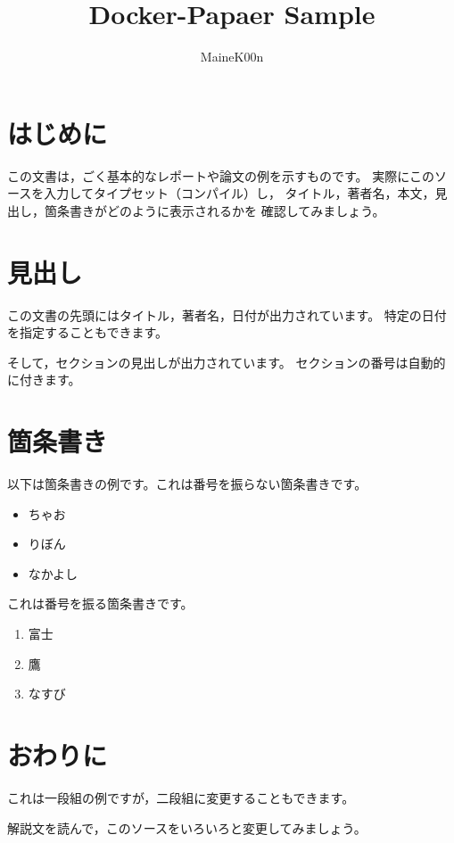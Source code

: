 \documentclass[a4paper]{jsarticle}
\begin{document}
\title{Docker-Papaer Sample}
\author{MaineK00n}
\maketitle

\section{はじめに}

この文書は，ごく基本的なレポートや論文の例を示すものです。
実際にこのソースを入力してタイプセット（コンパイル）し，
タイトル，著者名，本文，見出し，箇条書きがどのように表示されるかを
確認してみましょう。

\section{見出し}

この文書の先頭にはタイトル，著者名，日付が出力されています。
特定の日付を指定することもできます。

そして，セクションの見出しが出力されています。
セクションの番号は自動的に付きます。

\section{箇条書き}

以下は箇条書きの例です。これは番号を振らない箇条書きです。

\begin{itemize}
  \item ちゃお
  \item りぼん
  \item なかよし
\end{itemize}

これは番号を振る箇条書きです。

\begin{enumerate}
  \item 富士
  \item 鷹
  \item なすび
\end{enumerate}

\section{おわりに}

これは一段組の例ですが，二段組に変更することもできます。

解説文を読んで，このソースをいろいろと変更してみましょう。
\end{document}
